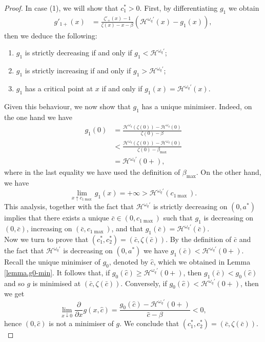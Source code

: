 \documentclass[11pt,reqno]{amsart}
\newcommand{\cH}{\mathcal{H}}
\newcommand{\homega}{\omega_q}
\renewcommand{\geq}{\geqslant}
\begin{document}
\begin{proof}
	In case (1), we will show that $c_1^\ast > 0$. First, by differentiating $g_1$ we obtain
		\begin{align*}
		g'_{1+}(x)&=\frac{\zeta'_+(x)-1}{\zeta(x)-x-\beta}(\cH^{\homega\prime}(x) - g_1(x)),
		\end{align*}
		then we deduce the following:
			\begin{enumerate}
					\item $g_1$ is strictly decreasing if and only if $ g_1 < \cH^{\homega\prime}$;
					\item $g_1$ is strictly increasing if and only if $ g_1 > \cH^{\homega\prime}$;
					\item $g_1$ has a critical point at $x$ if and only if $ g_1(x) = \cH^{\homega\prime}(x)$.
				\end{enumerate}
	Given this behaviour, we now show that $g_1$ has a unique minimiser. Indeed, on the one hand we have
	\begin{align*}
		g_1(0) &= \frac{\cH^{\homega}(\zeta(0)) - \cH^{\homega}(0)}{\zeta(0)-\beta}\\
		& < \frac{\cH^{\homega}(\zeta(0)) - \cH^{\homega}(0)}{\zeta(0)-\beta_{\max}}\\
		&= \cH^{\homega\prime}(0+),
	\end{align*}
	where in the last equality we have used the definition of $\beta_{\max}$. On the other hand, we have
	\[
	\lim_{x \uparrow c_{1\max}}g_1(x) = +\infty > \cH^{\homega\prime}(c_{1\max}).
	\]
	This analysis, together with the fact that $\cH^{\homega\prime}$ is strictly decreasing on $(0,a^\ast)$ implies that there exists a unique $\bar{c} \in (0,c_{1\max})$ such that $g_1$ is decreasing on $(0,\bar{c})$, increasing on $(\bar{c},c_{1\max})$, and that $g_1(\bar{c})= \cH^{\homega\prime}(\bar{c})$.\\
	Now we turn to prove that $(c_1^\ast,c_2^\ast) = (\bar{c},\zeta(\bar{c}))$. By the definition of $\bar{c}$ and the fact that $\cH^{\homega\prime}$ is decreasing on $(0,a^\ast)$ we have $g_1(\bar{c})< \cH^{\homega\prime}(0+)$. Recall the unique minimiser of $g_0$, denoted by $\hat{c}$, which we obtained in Lemma \ref{lemma.g0-min}. It follows that, if $g_0(\hat{c})\geq \cH^{\homega\prime}(0+)$, then $g_1(\bar{c}) < g_0(\hat{c})$ and so $g$ is minimised at $(\bar{c},\zeta(\bar{c}))$. Conversely, if $g_0(\hat{c}) < \cH^{\homega\prime}(0+)$, then we get
	\[
	\lim_{x\downarrow 0}\frac{\partial}{\partial x} g(x,\hat{c}) = \frac{g_0(\hat{c}) - \cH^{\homega\prime}(0+)}{\hat{c}-\beta} < 0,
	\]
	hence $(0,\hat{c})$ is not a minimiser of $g$. We conclude that $(c_1^\ast,c_2^\ast) = (\bar{c},\zeta(\bar{c}))$.\\

\end{proof}
\end{document}
